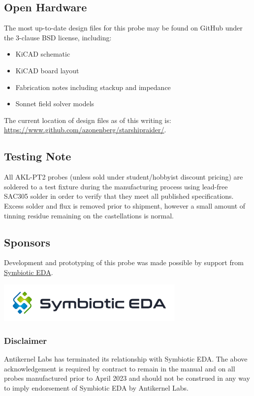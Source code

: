 \documentclass[11pt]{article}
\begin{document}
\subsection{Open Hardware}

The most up-to-date design files for this probe may be found on GitHub under the 3-clause BSD license, including:

\begin{itemize}
\item KiCAD schematic
\item KiCAD board layout
\item Fabrication notes including stackup and impedance
\item Sonnet field solver models
\end{itemize}

The current location of design files as of this writing is:
\url{https://www.github.com/azonenberg/starshipraider/}.

\subsection{Testing Note}

All AKL-PT2 probes (unless sold under student/hobbyist discount pricing) are soldered to a test fixture during
the manufacturing process using lead-free SAC305 solder in order to verify that they meet all published specifications.
Excess solder and flux is removed prior to shipment, however a small amount of tinning residue remaining on the
castellations is normal.

\pagebreak
\subsection{Sponsors}

Development and prototyping of this probe was made possible by support from
\href{https://www.symbioticeda.com/}{Symbiotic EDA}.

\includegraphics[height=2cm]{symbiotic-logo.png}

\subsubsection{Disclaimer}

Antikernel Labs has terminated its relationship with Symbiotic EDA. The above acknowledgement is required by contract to
remain in the manual and on all probes manufactured prior to April 2023 and should not be construed in any way to imply
endorsement of Symbiotic EDA by Antikernel Labs.
\end{document}
